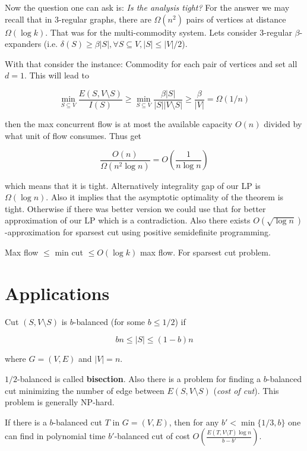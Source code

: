 Now the question one can ask is: \textit{Is the analysis tight?} For the answer we may recall that in 3-regular graphs, there are $\Omega (n^{2})$ pairs of vertices at distance $\Omega (\log k)$. That was for the multi-commodity system. Lets consider 3-regular $\beta$-expanders (i.e. $\delta (S) \geq \beta|S|, \forall S \subseteq V, |S| \leq |V|/2$).

With that consider the instance: Commodity for each pair of vertices and set all $d = 1$. This will lead to

$$
\min_{S \subseteq V} \frac{E(S, V \setminus S)}{I(S)} \geq \min_{S \subseteq V} \frac{\beta |S|}{|S| |V \setminus S|} \geq \frac{\beta}{|V|} = \Omega(1/n)
$$

then the max concurrent flow is at most the available capacity $O(n)$ divided by what unit of flow consumes. Thus get

$$
\frac{O(n)}{\Omega (n^{2} \log n)} = O\left( \frac{1}{n \log n} \right)
$$

which means that it is tight. Alternatively integrality gap of our LP is $\Omega(\log n)$. Also it implies that the asymptotic optimality of the theorem is tight. Otherwise if there was better version we could use that for better approximation of our LP which is a contradiction. Also there exists $O(\sqrt{\log n})$-approximation for sparsest cut using positive semidefinite programming.

\begin{cor}
	Max flow $\leq$ min cut $\leq O(\log k)$ max flow. For sparsest cut problem.
\end{cor}

\section{Applications}

\begin{defn}
	Cut $(S, V \setminus S)$ is $b$-balanced (for some $b \leq 1/2$) if
	
	$$
	b n \leq |S| \leq (1-b)n
	$$
	
	where $G = (V,E)$ and $|V| = n$.
\end{defn}

$1/2$-balanced is called \textbf{bisection}. Also there is a problem for finding a $b$-balanced cut minimizing the number of edge between $E(S, V \setminus S)$ (\textit{cost of cut}). This problem is generally NP-hard.

\begin{thm}
	If there is a $b$-balanced cut $T$ in $G = (V,E)$, then for any $b' < \min\{1/3, b\}$ one can find in polynomial time $b'$-balanced cut of cost $O \left(\frac{E(T, V \setminus T) \log n}{b-b'}\right)$.
\end{thm}

